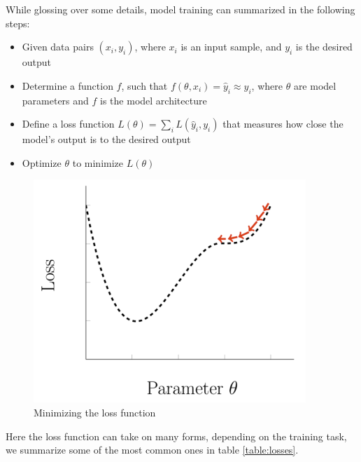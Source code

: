 While glossing over some details, model training can summarized in the following steps:
\begin{itemize}
    \item Given data pairs $(x_i, y_i)$, where $x_i$ is an input sample, and $y_i$ is the desired output
    \item Determine a function $f$, such that $f(\theta, x_i) = \hat{y}_i \approx y_i$, where $\theta$ are model parameters and $f$ is the model architecture
    \item Define a loss function $L(\theta) = \sum_i L(\hat{y}_i, y_i)$ that measures how close the model's output is to the desired output
    \item Optimize $\theta$ to minimize $L(\theta)$
\end{itemize}
\begin{figure}[h]
    \includegraphics[width=\linewidth]{chapters/NLP/figures/loss.png}
    \caption{Minimizing the loss function}
    \label{fig:loss}
\end{figure}
Here the loss function can take on many forms, depending on the training task, we summarize some of the most common ones in table \ref{table:losses}.
